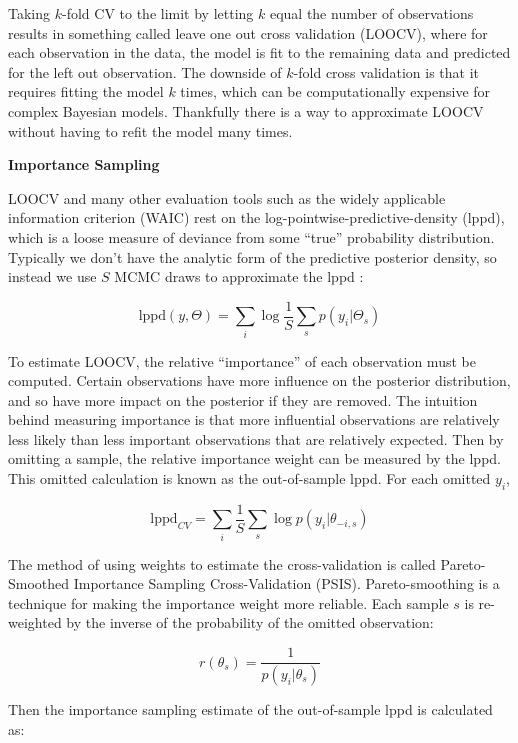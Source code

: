 \documentclass[11pt, oneside, openany]{scrbook}
\begin{document}
Taking \(k\)-fold CV to the limit by letting \(k\) equal the number of observations results in something called leave one out cross validation (LOOCV), where for each observation in the data, the model is fit to the remaining data and predicted for the left out observation. The downside of \(k\)-fold cross validation is that it requires fitting the model \(k\) times, which can be computationally expensive for complex Bayesian models. Thankfully there is a way to approximate LOOCV without having to refit the model many times.

\textbf{Importance Sampling}

LOOCV and many other evaluation tools such as the widely applicable information criterion (WAIC) rest on the log-pointwise-predictive-density (lppd), which is a loose measure of deviance from some ``true'' probability distribution. Typically we don't have the analytic form of the predictive posterior density, so instead we use \(S\) MCMC draws to approximate the lppd \citep{vehtari2017practical}:

\begin{equation}
\mathrm{lppd}(y, \Theta) = \sum_i \log \frac{1}{S} \sum_s p(y_i | \Theta_s)
\label{eq:lppd}
\end{equation}

To estimate LOOCV, the relative ``importance'' of each observation must be computed. Certain observations have more influence on the posterior distribution, and so have more impact on the posterior if they are removed. The intuition behind measuring importance is that more influential observations are relatively less likely than less important observations that are relatively expected. Then by omitting a sample, the relative importance weight can be measured by the lppd. This omitted calculation is known as the out-of-sample lppd. For each omitted \(y_i\),

\[
\mathrm{lppd}_{CV} = \sum_i \frac{1}{S} \sum_s \log p(y_{i} | \theta_{-i,s})
\]

The method of using weights to estimate the cross-validation is called Pareto-Smoothed Importance Sampling Cross-Validation (PSIS). Pareto-smoothing is a technique for making the importance weight more reliable. Each sample \(s\) is re-weighted by the inverse of the probability of the omitted observation:

\[
r(\theta_s) = \frac{1}{p(y_i \vert \theta_s)}
\]

Then the importance sampling estimate of the out-of-sample lppd is calculated as:
\end{document}
